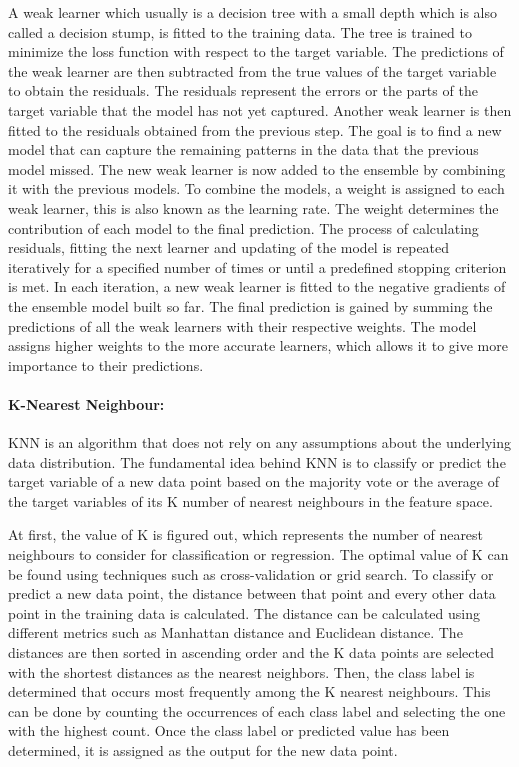 \documentclass[a4paper,fleqn]{cas-sc}
\begin{document}
A weak learner which usually is a decision tree with a small depth which is also called a decision stump, is fitted to the training data. The tree is trained to minimize the loss function with respect to the target variable. The predictions of the weak learner are then subtracted from the true values of the target variable to obtain the residuals. The residuals represent the errors or the parts of the target variable that the model has not yet captured. Another weak learner is then fitted to the residuals obtained from the previous step. The goal is to find a new model that can capture the remaining patterns in the data that the previous model missed. The new weak learner is now added to the ensemble by combining it with the previous models. To combine the models, a weight is assigned to each weak learner, this is also known as the learning rate. The weight determines the contribution of each model to the final prediction. The process of calculating residuals, fitting the next learner and updating of the model is repeated iteratively for a specified number of times or until a predefined stopping criterion is met. In each iteration, a new weak learner is fitted to the negative gradients of the ensemble model built so far. The final prediction is gained by summing the predictions of all the weak learners with their respective weights. The model assigns higher weights to the more accurate learners, which allows it to give more importance to their predictions.

\paragraph{K-Nearest Neighbour:}
KNN is an algorithm that does not rely on any assumptions about the underlying data distribution. The fundamental idea behind KNN is to classify or predict the target variable of a new data point based on the majority vote or the average of the target variables of its K number of nearest neighbours in the feature space. 

At first, the value of K is figured out, which represents the number of nearest neighbours to consider for classification or regression. The optimal value of K can be found using techniques such as cross-validation or grid search. To classify or predict a new data point, the distance between that point and every other data point in the training data is calculated. The distance can be calculated using different metrics such as Manhattan distance and Euclidean distance. The distances are then sorted in ascending order and the K data points are selected with the shortest distances as the nearest neighbors. Then, the class label is determined that occurs most frequently among the K nearest neighbours. This can be done by counting the occurrences of each class label and selecting the one with the highest count. Once the class label or predicted value has been determined, it is assigned as the output for the new data point.
\end{document}
